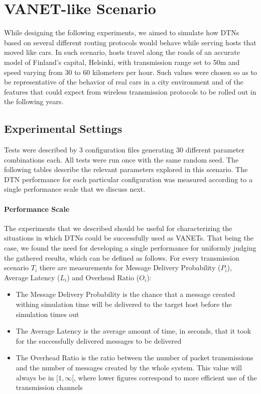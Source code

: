 \section{VANET-like Scenario}

While designing the following experiments, we aimed to simulate how DTNs based
on several different routing protocols would behave while serving hosts that
moved like cars. In such scenario, hosts travel along the roads of an accurate
model of Finland's capital, Helsinki, with transmission range set to 50m and
speed varying from 30 to 60 kilometers per hour. Such values were chosen so as
to be representative of the behavior of real cars in a city environment and of
the features that could expect from wireless transmission protocols to be
rolled out in the following years.

\subsection{Experimental Settings}

Tests were described by 3 configuration files generating 30 different parameter
combinations each.  All tests were run once with the same random seed.  The
following tables describe the relevant parameters explored in this scenario.
The DTN performance for each particular configuration was measured according to
a single performance scale that we discuss next.

\paragraph{Performance Scale}

The experiments that we described should be useful for characterizing the
situations in which DTNs could be successfully used as VANETs. That being the
case, we found the need for developing a single performance for uniformly
judging the gathered results, which can be defined as follows. For every
transmission scenario $T_i$ there are measurements for Message Delivery
Probability ($P_i$), Average Latency ($L_i$) and Overhead Ratio ($O_i$):

\begin{itemize}
    \item The Message Delivery Probability is the chance that a message
    created withing simulation time will be delivered to the target host
    before the simulation times out

    \item The Average Latency is the average amount of time, in seconds,
    that it took for the successfully delivered messages to be delivered

    \item The Overhead Ratio is the ratio between the number of packet
    transmissions and the number of messages created by the whole system.
    This value will always be in $[1, \infty[$, where lower figures correspond
    to more efficient use of the transmission channels
\end{itemize}

